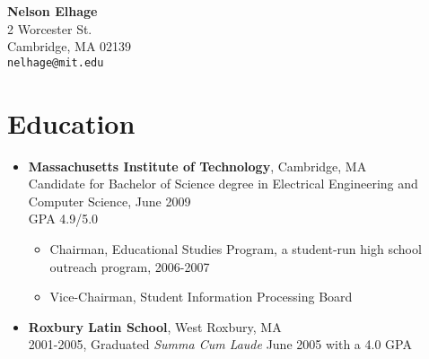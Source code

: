 \documentclass[letterpaper,10pt]{article}
\begin{document}
\begin{center}
  {\LARGE \bf Nelson Elhage}\\
  {\large
    2 Worcester St. \\
    Cambridge, MA 02139 \\
    \mbox{\small \tt nelhage@mit.edu}}
\end{center}

\section*{Education}
\vspace*{-0.2cm}
\begin{itemize}
  \item \textbf{Massachusetts Institute of Technology}, Cambridge, MA
    \\ Candidate for Bachelor of Science degree in Electrical
    Engineering and Computer Science, June 2009 \\
    GPA 4.9/5.0
    \vspace*{-0.2cm}
    \begin{itemize}
      \item Chairman, Educational Studies Program, a student-run
        high school outreach program, 2006-2007
      \item Vice-Chairman, Student Information Processing Board
    \end{itemize}
  \item \textbf{Roxbury Latin School}, West Roxbury, MA \\ 2001-2005,
    Graduated {\em Summa Cum Laude} June 2005 with a 4.0 GPA
\end{itemize}

\vspace*{-0.7cm}
\end{document}
